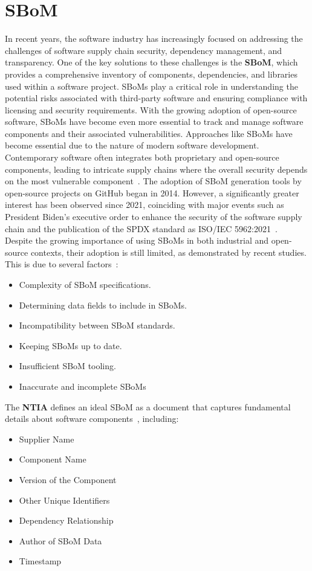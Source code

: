 \documentclass[12pt,a4paper, oneside, openright]{book}
\newcommand{\sbom}{{SBoM}\xspace}
\newcommand{\sboms}{{SBoMs}\xspace}
\begin{document}
\section{\sbom}
In recent years, the software industry has increasingly focused on addressing the challenges of software supply chain security, dependency management, and transparency. One of the key solutions to these challenges is the \textbf{\sbom}, which provides a comprehensive inventory of components, dependencies, and libraries used within a software project. \sboms play a critical role in understanding the potential risks associated with third-party software and ensuring compliance with licensing and security requirements. With the growing adoption of open-source software, \sboms have become even more essential to track and manage software components and their associated vulnerabilities.
Approaches like \sboms have become essential due to the nature of modern software development. Contemporary software often integrates both proprietary and open-source components, leading to intricate supply chains where the overall security depends on the most vulnerable component~\cite{10336262}.
The adoption of \sbom generation tools by open-source projects on GitHub began in 2014. However, a significantly greater interest has been observed since 2021, coinciding with major events such as President Biden's executive order to enhance the security of the software supply chain and the publication of the SPDX standard as ISO/IEC 5962:2021~\cite{10336262}.\\
Despite the growing importance of using \sboms in both industrial and open-source contexts, their adoption is still limited, as demonstrated by recent studies.
This is due to several factors~\cite{BOMs_Away!}:
\begin{itemize}
    \item Complexity of \sbom specifications.
    \item Determining data fields to include in \sboms.
    \item Incompatibility between \sbom standards.
    \item Keeping \sboms up to date.
    \item Insufficient \sbom tooling.
    \item Inaccurate and incomplete \sboms
\end{itemize}
The \textbf{NTIA} defines an ideal \sbom as a document that captures fundamental details about software components~\cite{NTIA}, including:
\begin{itemize}
    \item Supplier Name
    \item Component Name
    \item Version of the Component
    \item Other Unique Identifiers 
    \item Dependency Relationship
    \item Author of \sbom Data
    \item Timestamp
\end{itemize}
\end{document}
